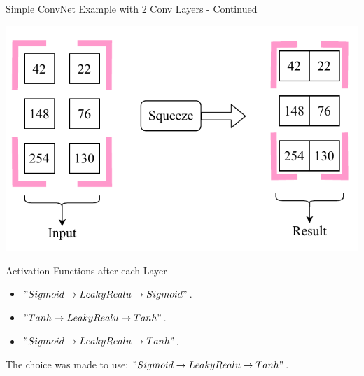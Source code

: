 \documentclass{beamer}
\begin{document}
		\begin{frame}{Simple ConvNet Example with 2 Conv Layers - Continued}
			\begin{center}
				\includegraphics[height=0.8\textheight]{squeeze}
			\end{center}
		\end{frame}
		\begin{frame}{Activation Functions after each Layer}
			\begin{itemize}
				\item $" Sigmoid \rightarrow LeakyRealu \rightarrow Sigmoid "$.
				\item $" Tanh \rightarrow LeakyRealu \rightarrow Tanh "$.
				\item $" Sigmoid \rightarrow LeakyRealu \rightarrow Tanh "$.
			\end{itemize}
			The choice was made to use: $" Sigmoid \rightarrow LeakyRealu \rightarrow Tanh "$.
		\end{frame}
\end{document}

